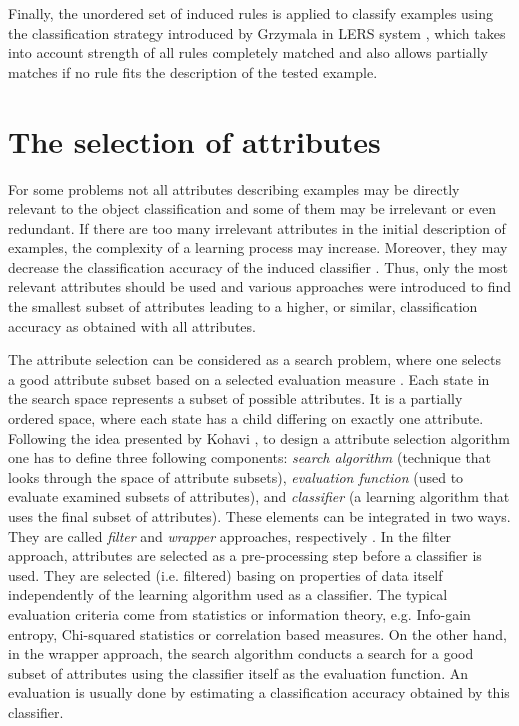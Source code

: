 \documentclass{elsart}
\begin{document}
Finally, the unordered set of induced rules is applied to classify examples
using the classification strategy introduced by Grzymala in LERS system
\cite{GrzymClass}, which takes into account strength of all rules completely
matched and also allows partially matches if no rule fits the description of
the tested example.


\section{The selection of attributes}

For some problems not all attributes describing examples may be directly
relevant to the object classification and some of them may be irrelevant or
even redundant. If there are too many irrelevant attributes in the initial
description of examples, the complexity of a learning process may increase.
Moreover, they may decrease the classification accuracy of the induced
classifier \cite{Kohavi94}. Thus, only the most relevant attributes should
be used and various approaches were introduced to find the smallest subset
of attributes leading to a higher, or similar, classification accuracy as
obtained with all attributes.

The attribute selection can be considered as a search problem, where one
selects a good attribute subset based on a selected evaluation measure
\cite{Kohavi94,Kohavi95}. Each state in the search space represents a subset
of possible attributes. It is a partially ordered space, where each state
has a child differing on exactly one attribute. Following  the idea
presented by Kohavi \cite{Kohavi94}, to design a attribute selection
algorithm one has to define three following components: {\em search
algorithm} (technique that looks through the space of attribute subsets),
{\em evaluation function} (used to evaluate examined subsets of attributes),
and {\em classifier}  (a learning algorithm that uses the final subset of
attributes). These elements can be integrated in two ways. They are called
\emph{filter} and \emph{wrapper} approaches, respectively \cite{Kohavi94}.
In the filter approach, attributes are selected as a pre-processing step
before a classifier is used. They are selected (i.e. filtered) basing on
properties of data itself independently of the learning algorithm used as a
classifier. The typical evaluation criteria come from statistics or
information theory, e.g. Info-gain entropy, Chi-squared statistics or
correlation based measures. On the other hand, in the wrapper approach, the
search algorithm conducts a search for a good subset of attributes using the
classifier itself as the evaluation function. An evaluation is usually done
by estimating a classification accuracy obtained by this classifier.
\end{document}
